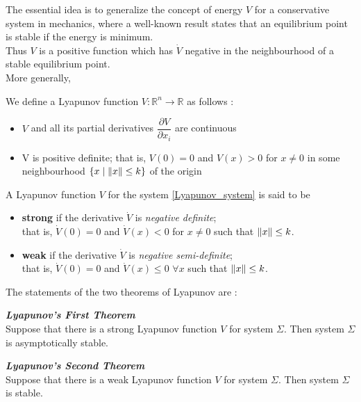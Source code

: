 The essential idea is to generalize the concept of energy $V$ for a conservative system in mechanics, where a well-known result states that an equilibrium point is stable if the energy is minimum.
\\Thus $V$ is a positive function which has $\dot{V}$ negative in the neighbourhood of a stable equilibrium point.\\
More generally,
\begin{definition}
	We define a Lyapunov function $V : \mathbb{R}^{n} \rightarrow  \mathbb{R}$ as follows :
	\begin{itemize}
		\item  $V$ and all its partial derivatives $\dfrac{\partial V}{\partial x_{i}}$ are continuous
		\item V is positive definite; that is, $V(0)=0$ and $V(x)>0$ for $x\neq0$ in
		some neighbourhood $\{x \mid \left\lVert x\right\rVert \leq k\}$ of the origin
	\end{itemize}
\end{definition}

A Lyapunov function $V$ for the system \eqref{Lyapunov_system} is said to be
\begin{itemize}
	\item \textbf{strong} if the derivative $\dot{V}$ is \textit{negative definite};\\ that is, $\dot{V}(0) = 0$  and $\dot{V}(x)<0$ for $x\neq0$ such that $\left\lVert x\right\rVert\leq k$.
	\item \textbf{weak} if the derivative $\dot{V}$ is \textit{negative semi-definite};\\that is, $\dot{V}(0) = 0$ and $\dot{V}(x)\leq0$ $\forall x$ such that $\left\lVert x\right\rVert\leq k$.
\end{itemize}

The statements of the two theorems of Lyapunov are :
\begin{theorem}
	\emph{\textbf{Lyapunov’s First Theorem}}\\ Suppose that there is a strong Lyapunov function $V$ for system $\varSigma$. Then system $\varSigma$ is asymptotically stable.
\end{theorem}
\begin{theorem}
	\emph{\textbf{Lyapunov’s Second Theorem}}\\  Suppose that there is a weak Lyapunov function $V$ for system $\varSigma$. Then system $\varSigma$ is stable.
\end{theorem}
